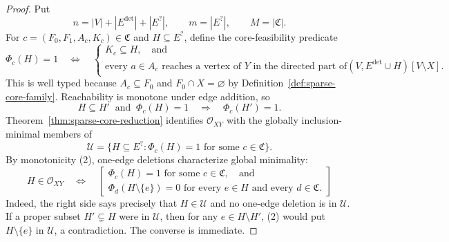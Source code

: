 \documentclass{article}
\begin{document}
\begin{proof}
Put
\[
 n=|V|+|E^{\mathrm{det}}|+|E^{?}|,
 \qquad m=|E^{?}|,
 \qquad M=|\mathfrak C|.
\]
For \(c=(F_0,F_1,A_c,K_c)\in\mathfrak C\) and \(H\subseteq E^{?}\), define the core-feasibility predicate
\[
 \Phi_c(H)=1
 \quad\Longleftrightarrow\quad
 \left\{
 \begin{array}{l}
 K_c\subseteq H,\quad\text{and}\\[2mm]
 \text{every }a\in A_c\text{ reaches a vertex of }Y\text{ in the directed part of}
 (V,E^{\mathrm{det}}\cup H)[V\setminus X].
 \end{array}
 \right.
 \tag{1}
\]
This is well typed because \(A_c\subseteq F_0\) and \(F_0\cap X=\varnothing\) by Definition~\ref{def:sparse-core-family}.  Reachability is monotone under edge addition, so
\[
 H\subseteq H'\ \text{ and }\ \Phi_c(H)=1
 \quad\Longrightarrow\quad
 \Phi_c(H')=1.
 \tag{2}
\]
Theorem~\ref{thm:sparse-core-reduction} identifies \(\mathcal O_{XY}\) with the globally inclusion-minimal members of
\[
 \mathscr U=\{H\subseteq E^{?}:\Phi_c(H)=1\text{ for some }c\in\mathfrak C\}.
\]
By monotonicity (2), one-edge deletions characterize global minimality:
\[
 H\in\mathcal O_{XY}
 \quad\Longleftrightarrow\quad
 \left[
 \begin{array}{l}
 \Phi_c(H)=1\text{ for some }c\in\mathfrak C,\quad\text{and}\\
 \Phi_d(H\setminus\{e\})=0
 \text{ for every }e\in H\text{ and every }d\in\mathfrak C.
 \end{array}
 \right]
 \tag{3}
\]
Indeed, the right side says precisely that \(H\in\mathscr U\) and no one-edge deletion is in \(\mathscr U\).  If a proper subset \(H'\subsetneq H\) were in \(\mathscr U\), then for any \(e\in H\setminus H'\), (2) would put \(H\setminus\{e\}\) in \(\mathscr U\), a contradiction.  The converse is immediate.


\end{proof}
\end{document}
